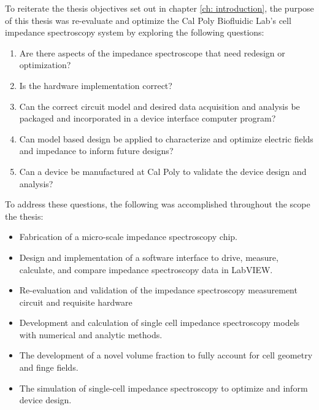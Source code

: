 \label{ch: discussion}



To reiterate the thesis objectives set out in chapter \ref{ch: introduction}, the purpose of this thesis was re-evaluate and optimize the Cal Poly Biofluidic Lab's cell impedance spectroscopy system by exploring the following questions:

\begin{enumerate}
    \item Are there aspects of the impedance spectroscope that need redesign or optimization?
    \item Is the hardware implementation correct?
    \item Can the correct circuit model and desired data acquisition and analysis be packaged and incorporated in a device interface computer program?
    \item Can model based design be applied to characterize and optimize electric fields and impedance to inform future designs?
    \item Can a device be manufactured at Cal Poly to validate the device design and analysis?
\end{enumerate}

\par To address these questions, the following was accomplished throughout the scope the thesis:
\begin{itemize}
    \item Fabrication of a micro-scale impedance spectroscopy chip.
    \item Design and implementation of a software interface to drive, measure, calculate, and compare impedance spectroscopy data in LabVIEW.
    \item Re-evaluation and validation of the impedance spectroscopy measurement circuit and requisite hardware
    \item Development and calculation of single cell impedance spectroscopy models with numerical and analytic methods. 
    \item The development of a novel volume fraction to fully account for cell geometry and finge fields.
    \item The simulation of single-cell impedance spectroscopy to optimize and inform device design. 
\end{itemize}

